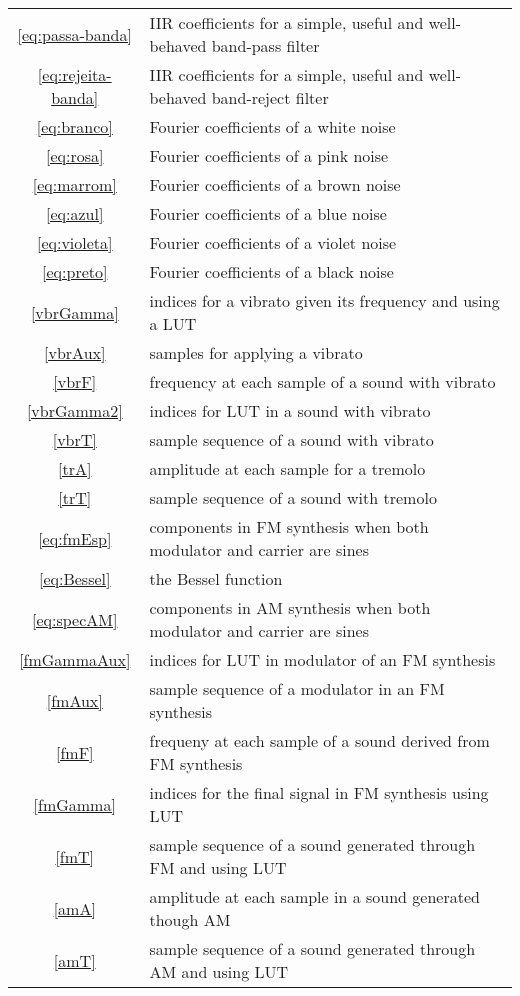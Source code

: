 \documentclass{scrreprt}
\newcommand*{\reff}[1]{%
	{\NoHyper\ref{#1}\endNoHyper}%
	  }
\begin{document}
\begin{table*}[htp!]
\begin{tabular}{ c | p{12cm} }
 \reff{eq:passa-banda} & IIR coefficients for a simple, useful and well-behaved band-pass filter \\
 \reff{eq:rejeita-banda} & IIR coefficients for a simple, useful and well-behaved band-reject filter \\
 \reff{eq:branco} & Fourier coefficients of a white noise \\
 \reff{eq:rosa} & Fourier coefficients of a pink noise \\
 \reff{eq:marrom} & Fourier coefficients of a brown noise \\
 \reff{eq:azul} & Fourier coefficients of a blue noise \\
 \reff{eq:violeta} & Fourier coefficients of a violet noise \\
 \reff{eq:preto} & Fourier coefficients of a black noise \\
 \reff{vbrGamma} & indices for a vibrato given its frequency and using a LUT \\
 \reff{vbrAux} & samples for applying a vibrato \\
 \reff{vbrF} & frequency at each sample of a sound with vibrato \\
 \reff{vbrGamma2} & indices for LUT in a sound with vibrato \\
 \reff{vbrT} & sample sequence of a sound with vibrato \\
 \reff{trA} & amplitude at each sample for a tremolo \\
 \reff{trT} & sample sequence of a sound with tremolo \\
 \reff{eq:fmEsp} & components in FM synthesis when both modulator and carrier are sines \\
 \reff{eq:Bessel} & the Bessel function \\
 \reff{eq:specAM} & components in AM synthesis when both modulator and carrier are sines \\
 \reff{fmGammaAux} & indices for LUT in modulator of an FM synthesis \\
 \reff{fmAux} & sample sequence of a modulator in an FM synthesis \\
 \reff{fmF} & frequeny at each sample of a sound derived from FM synthesis \\
 \reff{fmGamma} & indices for the final signal in FM synthesis using LUT \\
 \reff{fmT} & sample sequence of a sound generated through FM and using LUT \\
 \reff{amA} & amplitude at each sample in a sound generated though AM \\
 \reff{amT} & sample sequence of a sound generated through AM and using LUT \\
\end{tabular}
\end{table*}
\end{document}
